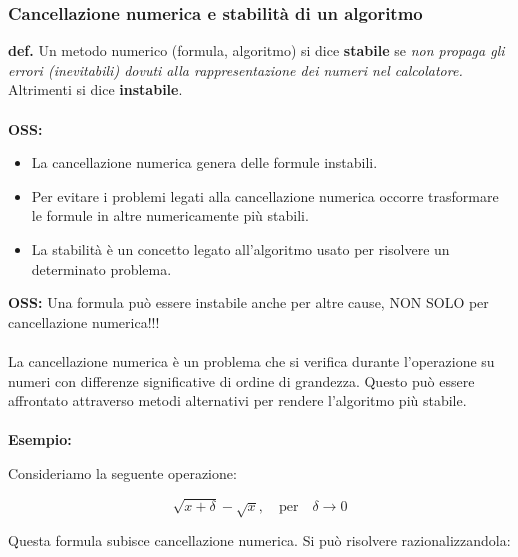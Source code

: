 \documentclass[a4paper, 11pt]{article}
\begin{document}
        \subsubsection*{Cancellazione numerica e stabilità di un algoritmo}

        \textbf{def. }Un metodo numerico (formula, algoritmo) si dice \textbf{stabile} se \textit{non propaga gli errori (inevitabili) dovuti alla rappresentazione dei numeri nel calcolatore.} Altrimenti si dice \textbf{instabile}.

        \paragraph{}
        \textbf{OSS: }
        \begin{itemize}
            \item La cancellazione numerica genera delle formule instabili.
            \item Per evitare i problemi legati alla cancellazione numerica occorre trasformare le formule in altre numericamente più stabili.
            \item La stabilità è un concetto legato all’algoritmo usato per risolvere un determinato problema.
        \end{itemize}

        \textbf{OSS: } Una formula può essere instabile anche per altre cause, NON SOLO per cancellazione numerica!!!
        
        \paragraph{}
        La cancellazione numerica è un problema che si verifica durante l'operazione su numeri con differenze significative di ordine di grandezza. Questo può essere affrontato attraverso metodi alternativi per rendere l'algoritmo più stabile.

        \paragraph{}
        \textbf{Esempio: }

        Consideriamo la seguente operazione:


        \[
        \sqrt{x + \delta} - \sqrt{x}, \quad \text{per} \quad \delta \to 0
        \]



        Questa formula subisce cancellazione numerica. Si può risolvere razionalizzandola:
\end{document}
